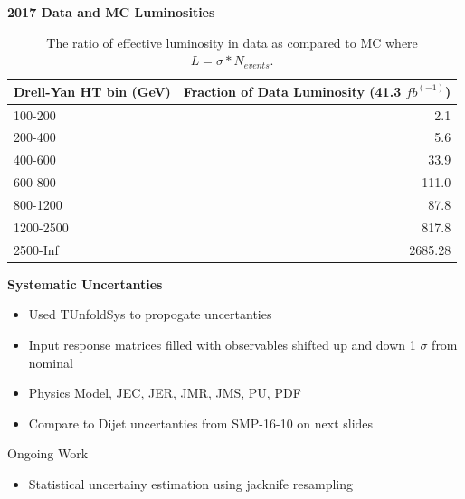 \documentclass{beamer}
\begin{document}
\begin{frame}{\textbf{2017 Data and MC Luminosities}}

 \begin{table}
\centering
\begin{tabular}{l|r}
Drell-Yan HT bin (GeV) & Fraction of Data Luminosity (41.3 $fb^(-1)$)\\\hline
100-200 & 2.1 \\
200-400 & 5.6 \\
400-600 & 33.9 \\
600-800 & 111.0 \\
800-1200 & 87.8 \\
1200-2500 & 817.8 \\
2500-Inf & 2685.28 \\


\end{tabular}
\caption{\label{tab:datamclumi} The ratio of effective luminosity in data as compared to MC where $ L = \sigma * N_{events}$.}
\end{table}
 
 



\end{frame}
\begin{frame}{\textbf{Systematic Uncertanties}}
\begin{itemize}
  \item Used TUnfoldSys to propogate uncertanties 
  \item Input response matrices filled with observables shifted up and down 1 $\sigma$ from nominal 
  \item  Physics Model, JEC, JER, JMR, JMS, PU, PDF
  \item Compare to Dijet uncertanties from SMP-16-10 on next slides
\end{itemize}

\begin{block}{Ongoing Work}
\begin{itemize}
  \item Statistical uncertainy estimation using jacknife resampling
\end{itemize}

\end{block}


\end{frame}
\end{document}
